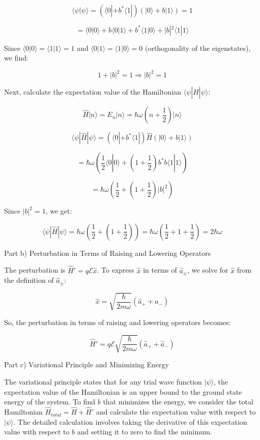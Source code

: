 \documentclass[a4paper,11pt]{article}
\begin{document}
\[
\langle \psi | \psi \rangle = \left( \langle 0 | + b^* \langle 1 | \right)\left( | 0 \rangle + b | 1 \rangle \right) = 1
\]

\[
= \langle 0 | 0 \rangle + b \langle 0 | 1 \rangle + b^* \langle 1 | 0 \rangle + |b|^2 \langle 1 | 1 \rangle
\]

Since \( \langle 0 | 0 \rangle = \langle 1 | 1 \rangle = 1 \) and \( \langle 0 | 1 \rangle = \langle 1 | 0 \rangle = 0 \) (orthogonality of the eigenstates), we find:

\[
1 + |b|^2 = 1 \Rightarrow |b|^2 = 1
\]

Next, calculate the expectation value of the Hamiltonian \( \langle \psi | \hat{H} | \psi \rangle \):

\[
\hat{H} | n \rangle = E_n | n \rangle = \hbar \omega \left( n + \frac{1}{2} \right) | n \rangle
\]

\[
\langle \psi | \hat{H} | \psi \rangle = \left( \langle 0 | + b^* \langle 1 | \right) \hat{H} \left( | 0 \rangle + b | 1 \rangle \right)
\]

\[
= \hbar\omega\left( \frac{1}{2} \langle 0 | 0 \rangle + \left( 1 + \frac{1}{2} \right) b^*b \langle 1 | 1 \rangle \right)
\]

\[
= \hbar\omega\left( \frac{1}{2} + \left( 1 + \frac{1}{2} \right) |b|^2 \right)
\]

Since \( |b|^2 = 1 \), we get:

\[
\langle \psi | \hat{H} | \psi \rangle = \hbar\omega\left( \frac{1}{2} + \left( 1 + \frac{1}{2} \right) \right) = \hbar\omega\left( \frac{1}{2} + 1 + \frac{1}{2} \right) = 2\hbar\omega
\]

Part b) Perturbation in Terms of Raising and Lowering Operators

The perturbation is \( \hat{H}' = q \mathcal{E} \hat{x} \). To express \( \hat{x} \) in terms of \( \hat{a}_{\pm} \), we solve for \( \hat{x} \) from the definition of \( \hat{a}_{\pm} \):

\[
\hat{x} = \sqrt{\frac{\hbar}{2m\omega}}(\hat{a}_+ + \hat{a}_-)
\]

So, the perturbation in terms of raising and lowering operators becomes:

\[
\hat{H}' = q \mathcal{E} \sqrt{\frac{\hbar}{2m\omega}}(\hat{a}_+ + \hat{a}_-)
\]

Part c) Variational Principle and Minimizing Energy

The variational principle states that for any trial wave function \( | \psi \rangle \), the expectation value of the Hamiltonian is an upper bound to the ground state energy of the system. To find \( b \) that minimizes the energy, we consider the total Hamiltonian \( \hat{H}_{total} = \hat{H} + \hat{H}' \) and calculate the expectation value with respect to \( | \psi \rangle \). The detailed calculation involves taking the derivative of this expectation value with respect to \( b \) and setting it to zero to find the minimum.
\end{document}

